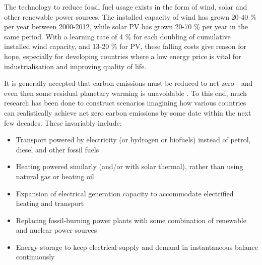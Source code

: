 \documentclass[report_18month.tex]{subfiles}
\begin{document}
The technology to reduce fossil fuel usage exists in the form of wind, solar and other renewable power sources. The installed capacity of wind has grown 20-40 \% per year between 2000-2012, while solar PV has grown 20-70 \% per year in the same period. \cite{carbajales2014storage} With a learning rate of 4 \% for each doubling of cumulative installed wind capacity, and 13-20 \% for PV, these falling costs give reason for hope, especially for developing countries where a low energy price is vital for industrialisation and improving quality of life. \cite{tol2017socialcost}

It is generally accepted that carbon emissions must be reduced to net zero - and even then some residual planetary warming is unavoidable \cite{frolicher2014co2}. To this end, much research has been done to construct scenarios imagining how various countries can realistically achieve net zero carbon emissions by some date within the next few decades. \cite{sluisveld2016nweu,eu2011roadmap2050,chai2014modeling,ccc2008} These invariably include:
\begin{itemize}
\item Transport powered by electricity (or hydrogen or biofuels) instead of petrol, diesel and other fossil fuels
\item Heating powered similarly (and/or with solar thermal), rather than using natural gas or heating oil
\item Expansion of electrical generation capacity to accommodate electrified heating and transport
\item Replacing fossil-burning power plants with some combination of renewable and nuclear power sources
\item Energy storage to keep electrical supply and demand in instantaneous balance continuously
\end{itemize}
\end{document}
